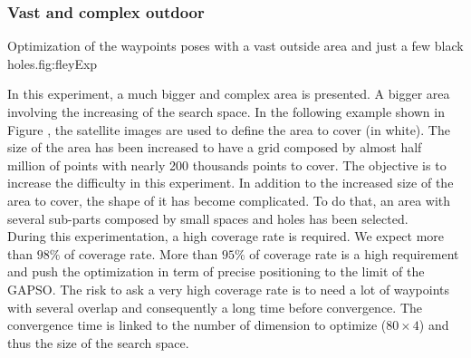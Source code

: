 		\subsubsection{Vast and complex outdoor}\label{sec:fey_map}

\begin{mfigures}[!]{Optimization of the waypoints poses with a vast outside area and just a few  black holes.}{fig:fleyExp} \centering
{}
\hspace{1cm}
\hspace{1cm}
\tabsimuposeFley
\end{mfigures}


In this experiment, a much bigger and complex area is presented.
	A bigger area involving the increasing of the search space. 
In the following example shown in Figure , the satellite images are used to define the area to cover (in white). The size of the area has been increased to have a grid composed by almost half million of points with nearly 200 thousands points to cover. 
The objective is to increase the difficulty in this experiment. In addition to the increased size of the area to cover, the shape of it has become complicated. To do that, an area with several sub-parts composed by small spaces and holes has been selected.\\
During this experimentation, a high coverage rate is required. We expect more than $98\%$ of coverage rate. More than $95\%$ of coverage rate is a high requirement and push the optimization in term of precise positioning to the limit of the GAPSO. The risk to ask a very high coverage rate is to need a lot of waypoints with several overlap and consequently a long time before convergence.  The convergence time is linked to the number of dimension to optimize  ($80\times 4 $) and  thus the size of the search space.

